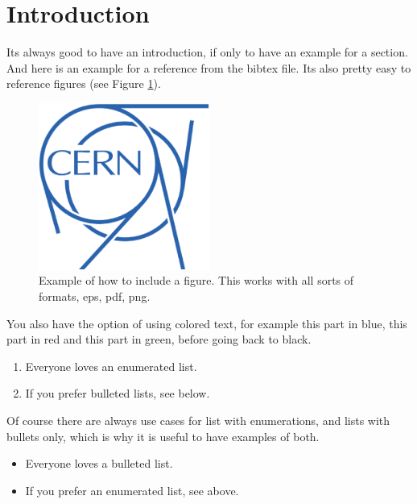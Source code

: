 \documentclass{smarthepnote}
\begin{document}
\section{Introduction}

Its always good to have an introduction, if only to have an example for a section. And here is an example for a reference from the bibtex file. Its also pretty easy to reference figures (see Figure \ref{fig:examplecernlogo}). \\
\begin{figure}[ht]
\centering
\includegraphics[width=0.5\textwidth]{images/cernlogo.eps}
\caption{\label{fig:examplecernlogo} Example of how to include a figure. This works with all sorts of formats, eps, pdf, png.}
\end{figure}

\FloatBarrier


You also have the option of using colored text, for example \color{blue} this part in blue,  \color{red} this part in red  \color{green} and this part in green, before \color{black} going back to black.  

\begin{enumerate}
\item Everyone loves an enumerated list.
\item If you prefer bulleted lists, see below.
\end{enumerate}

Of course there are always use cases for list with enumerations, and lists with bullets only, which is why it is useful to have examples of both.

\begin{itemize}
    \item Everyone loves a bulleted list.
    \item If you prefer an enumerated list, see above.
\end{itemize}
\end{document}
